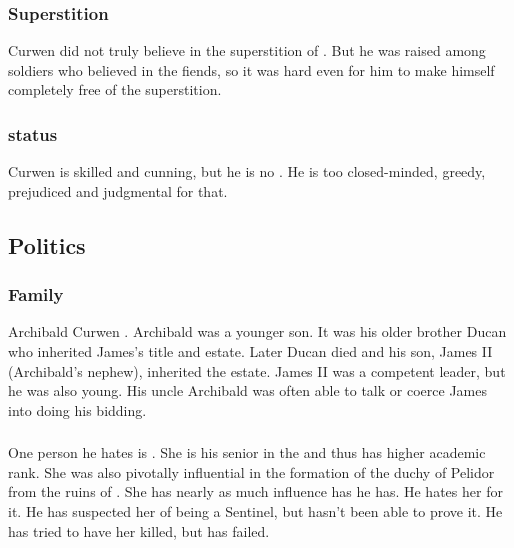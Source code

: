 \subsubsection{Superstition}
Curwen did not truly believe in the superstition of . 
But he was raised among soldiers who believed in the fiends, so it was hard even for him to make himself completely free of the superstition. 





\subsubsection{\Vertex{} status}
Curwen is skilled and cunning, but he is no \vertex.
He is too closed-minded, greedy, prejudiced and judgmental for that.









\subsection{Politics}





\subsubsection{Family}
Archibald Curwen . 
Archibald was a younger son. 
It was his older brother Ducan who inherited James's title and estate. 
Later Ducan died and his son, James II (Archibald's nephew), inherited the estate. 
James II was a competent leader, but he was also young. 
His uncle Archibald was often able to talk or coerce James into doing his bidding. 





\subsubsection{\MoroCobrel}
One person he hates is \MoroCobrel. 
She is his senior in the \ishrah{} and thus has higher academic rank. 
She was also pivotally influential in the formation of the duchy of Pelidor from the ruins of . 
She has nearly as much influence has he has. 
He hates her for it. 
He has suspected her of being a Sentinel, but hasn't been able to prove it. 
He has tried to have her killed, but has failed. 

